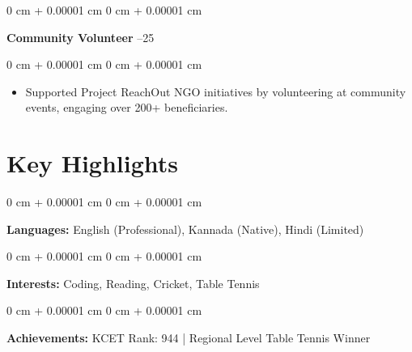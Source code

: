 \documentclass[10pt, letterpaper]{article}
\newenvironment{highlights}{
    \begin{itemize}[
        topsep=0.10 cm,
        parsep=0.10 cm,
        partopsep=0pt,
        itemsep=0pt,
        leftmargin=0 cm + 10pt
    ]
}{
    \end{itemize}
} %
\newenvironment{onecolentry}{
    \begin{adjustwidth}{
        0 cm + 0.00001 cm
    }{
        0 cm + 0.00001 cm
    }
}{
    \end{adjustwidth}
} %
\newenvironment{twocolentry}[2][]{
    \onecolentry
    \def\secondColumn{#2}
    \setcolumnwidth{\fill, 4.5 cm}
    \begin{paracol}{2}
}{
    \switchcolumn \raggedleft \secondColumn
    \end{paracol}
    \endonecolentry
} %
\begin{document}
        \vspace{0.2 cm}

        \begin{twocolentry}{
            2024–25
        }
            \textbf{Community Volunteer}\end{twocolentry}
        \vspace{0.05 cm}
        \begin{onecolentry}
            \begin{highlights}
                \item Supported Project ReachOut NGO initiatives by volunteering at community events, engaging over 200+ beneficiaries.
            \end{highlights}
        \end{onecolentry}

    \section{Key Highlights}

        \begin{onecolentry}
            \textbf{Languages:} English (Professional), Kannada (Native), Hindi (Limited)
        \end{onecolentry}

        \vspace{0.2 cm}

        \begin{onecolentry}
            \textbf{Interests:} Coding, Reading, Cricket, Table Tennis
        \end{onecolentry}

        \vspace{0.2 cm}

        \begin{onecolentry}
            \textbf{Achievements:} KCET Rank: 944 | Regional Level Table Tennis Winner
        \end{onecolentry}
\end{document}
